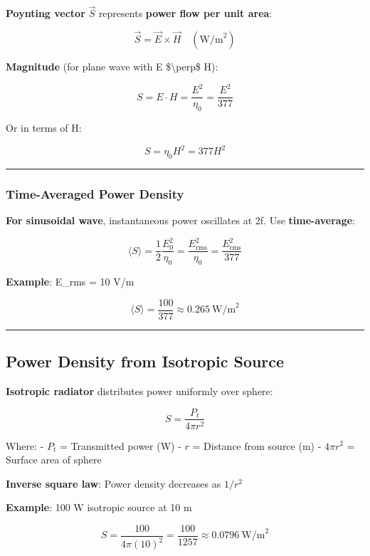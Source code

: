 \textbf{Poynting vector} \(\vec{S}\) represents \textbf{power flow per
unit area}:

\[
\vec{S} = \vec{E} \times \vec{H} \quad (\text{W/m}^2)
\]

\textbf{Magnitude} (for plane wave with E \$\textbackslash perp\$ H):

\[
S = E \cdot H = \frac{E^2}{\eta_0} = \frac{E^2}{377}
\]

Or in terms of H:

\[
S = \eta_0 H^2 = 377 H^2
\]

\begin{center}\rule{0.5\linewidth}{0.5pt}\end{center}

\subsubsection{Time-Averaged Power
Density}\label{time-averaged-power-density}

\textbf{For sinusoidal wave}, instantaneous power oscillates at 2f. Use
\textbf{time-average}:

\[
\langle S \rangle = \frac{1}{2} \frac{E_0^2}{\eta_0} = \frac{E_{\text{rms}}^2}{\eta_0} = \frac{E_{\text{rms}}^2}{377}
\]

\textbf{Example}: E\_rms = 10 V/m

\[
\langle S \rangle = \frac{100}{377} \approx 0.265\ \text{W/m}^2
\]

\begin{center}\rule{0.5\linewidth}{0.5pt}\end{center}

\subsection{Power Density from Isotropic
Source}\label{power-density-from-isotropic-source}

\textbf{Isotropic radiator} distributes power uniformly over sphere:

\[
S = \frac{P_t}{4\pi r^2}
\]

Where: - \(P_t\) = Transmitted power (W) - \(r\) = Distance from source
(m) - \(4\pi r^2\) = Surface area of sphere

\textbf{Inverse square law}: Power density decreases as \(1/r^2\)

\textbf{Example}: 100 W isotropic source at 10 m

\[
S = \frac{100}{4\pi (10)^2} = \frac{100}{1257} \approx 0.0796\ \text{W/m}^2
\]

